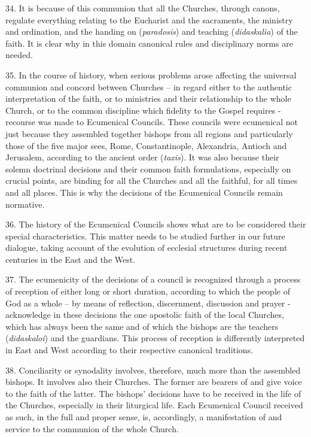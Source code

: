 34. It is because of this communion that all the Churches, through
canons, regulate everything relating to the Eucharist and the
sacraments, the ministry and ordination, and the handing on
(\emph{paradosis}) and teaching (\emph{didaskalia}) of the faith. It is
clear why in this domain canonical rules and disciplinary norms are
needed.

35. In the course of history, when serious problems arose affecting the
universal communion and concord between Churches -- in regard either to
the authentic interpretation of the faith, or to ministries and their
relationship to the whole Church, or to the common discipline which
fidelity to the Gospel requires - recourse was made to Ecumenical
Councils. These councils were ecumenical not just because they assembled
together bishops from all regions and particularly those of the five
major sees, Rome, Constantinople, Alexandria, Antioch and Jerusalem,
according to the ancient order (\emph{taxis}). It was also because their
solemn doctrinal decisions and their common faith formulations,
especially on crucial points, are binding for all the Churches and all
the faithful, for all times and all places. This is why the decisions of
the Ecumenical Councils remain normative.

36. The history of the Ecumenical Councils shows what are to be
considered their special characteristics. This matter needs to be
studied further in our future dialogue, taking account of the evolution
of ecclesial structures during recent centuries in the East and the
West.

37. The ecumenicity of the decisions of a council is recognized through
a process of reception of either long or short duration, according to
which the people of God as a whole -- by means of reflection,
discernment, discussion and prayer - acknowledge in these decisions the
one apostolic faith of the local Churches, which has always been the
same and of which the bishops are the teachers (\emph{didaskaloi}) and
the guardians. This process of reception is differently interpreted in
East and West according to their respective canonical traditions.

38. Conciliarity or synodality involves, therefore, much more than the
assembled bishops. It involves also their Churches. The former are
bearers of and give voice to the faith of the latter. The bishops'
decisions have to be received in the life of the Churches, especially in
their liturgical life. Each Ecumenical Council received as such, in the
full and proper sense, is, accordingly, a manifestation of and service
to the communion of the whole Church.

